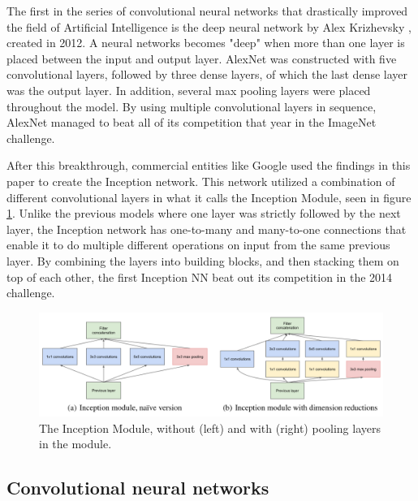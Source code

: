 
The first in the series of convolutional neural networks that drastically improved the field of Artificial Intelligence is the deep neural network by Alex Krizhevsky \cite{Krizhevsky:2017:ICD:3098997.3065386}, created in 2012. 
A neural networks becomes "deep" when more than one layer is placed between the input and output layer.
AlexNet was constructed with five convolutional layers, followed by three dense layers, of which the last dense layer was the output layer.
In addition, several max pooling layers were placed throughout the model.
By using multiple convolutional layers in sequence, AlexNet managed to beat all of its competition that year in the ImageNet\cite{ImageNetMain} challenge\cite{ImageNet2012}. 



After this breakthrough, commercial entities like Google used the findings in this paper to create the Inception\cite{szegedy2014going} network. 
This network utilized a combination of different convolutional layers in what it calls the Inception Module, seen in figure \cref{fig:inception}.
Unlike the previous models where one layer was strictly followed by the next layer, the Inception network has one-to-many and many-to-one connections that enable it to do multiple different operations on input from the same previous layer.
By combining the layers into building blocks, and then stacking them on top of each other, the first Inception NN beat out its competition in the 2014 challenge\cite{ImageNet2014}. %
%


\begin{figure}[htbp]  %
  \centering
  \includegraphics[width=.7\textwidth]{figures/google2.PNG}
  \caption{The Inception Module\cite{szegedy2014going}, without (left) and with (right) pooling layers in the module.}
  \label{fig:inception}
\end{figure}

\subsection{Convolutional neural networks}

